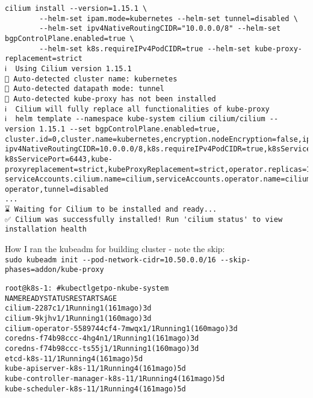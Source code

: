 \documentclass[Screen16to9,17pt]{foils}
\begin{document}
\begin{verbatim}
cilium install --version=1.15.1 \
		--helm-set ipam.mode=kubernetes --helm-set tunnel=disabled \
		--helm-set ipv4NativeRoutingCIDR="10.0.0.0/8" --helm-set bgpControlPlane.enabled=true \
		--helm-set k8s.requireIPv4PodCIDR=true --helm-set kube-proxy-replacement=strict
ℹ️  Using Cilium version 1.15.1
🔮 Auto-detected cluster name: kubernetes
🔮 Auto-detected datapath mode: tunnel
🔮 Auto-detected kube-proxy has not been installed
ℹ️  Cilium will fully replace all functionalities of kube-proxy
ℹ️  helm template --namespace kube-system cilium cilium/cilium --version 1.15.1 --set bgpControlPlane.enabled=true,
cluster.id=0,cluster.name=kubernetes,encryption.nodeEncryption=false,ipam.mode=kubernetes,
ipv4NativeRoutingCIDR=10.0.0.0/8,k8s.requireIPv4PodCIDR=true,k8sServiceHost=10.137.0.26,
k8sServicePort=6443,kube-proxyreplacement=strict,kubeProxyReplacement=strict,operator.replicas=1,
serviceAccounts.cilium.name=cilium,serviceAccounts.operator.name=cilium-operator,tunnel=disabled
...
⌛ Waiting for Cilium to be installed and ready...
✅ Cilium was successfully installed! Run 'cilium status' to view installation health
\end{verbatim}


How I ran the kubeadm for building cluster - note the skip:\\
\verb+sudo kubeadm init --pod-network-cidr=10.50.0.0/16 --skip-phases=addon/kube-proxy+

\slide{After install Cilium}

\begin{alltt}\footnotesize
root@k8s-1:~# kubectl get po -n kube-system
NAME                               READY   STATUS    RESTARTS       AGE
cilium-2287c                       1/1     Running   1 (161m ago)   3d
cilium-9kjhv                       1/1     Running   1 (160m ago)   3d
cilium-operator-5589744cf4-7mwqx   1/1     Running   1 (160m ago)   3d
coredns-f74b98ccc-4hg4n            1/1     Running   1 (161m ago)   3d
coredns-f74b98ccc-ts55j            1/1     Running   1 (160m ago)   3d
etcd-k8s-1                         1/1     Running   4 (161m ago)   5d
kube-apiserver-k8s-1               1/1     Running   4 (161m ago)   5d
kube-controller-manager-k8s-1      1/1     Running   4 (161m ago)   5d
kube-scheduler-k8s-1               1/1     Running   4 (161m ago)   5d
\end{alltt}



\end{document}
